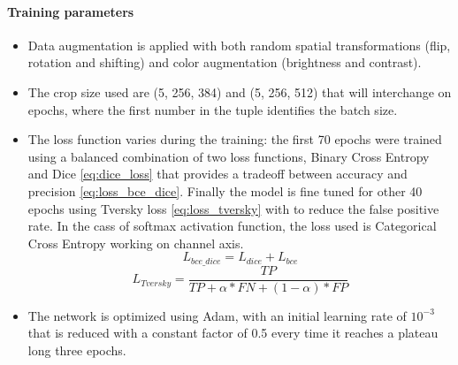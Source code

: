 \documentclass[10pt,twocolumn,letterpaper]{article}
\begin{document}
      \paragraph{Training parameters}
         \begin{itemize}
            \item Data augmentation is applied with both random spatial transformations (flip, rotation and shifting) and color augmentation (brightness and contrast).
            \item The crop size used are (5, 256, 384) and (5, 256, 512) that will interchange on epochs, where the first number in the tuple identifies the batch size.
            \item The loss function varies during the training: the first 70 epochs were trained using a balanced combination of two loss functions, Binary Cross Entropy and Dice \eqref{eq:dice_loss} that provides a tradeoff between accuracy and precision \eqref{eq:loss_bce_dice}. Finally the model is fine tuned for other 40 epochs using Tversky loss \eqref{eq:loss_tversky} with  to reduce the false positive rate. In the cass of softmax activation function, the loss used is Categorical Cross Entropy working on channel axis.
            \begin{equation}\label{eq:loss_bce_dice}
               L_{bce\_dice} = L_{dice} + L_{bce}
            \end{equation}
            \begin{equation}\label{eq:loss_tversky}
               L_{Tversky} = \frac{TP}{TP + \alpha*FN + (1-\alpha)*FP}
            \end{equation}
            \item The network is optimized using Adam, with an initial learning rate of $ 10^{-3} $ that is reduced with a constant factor of 0.5 every time it reaches a plateau long three epochs.
         \end{itemize}
\end{document}
